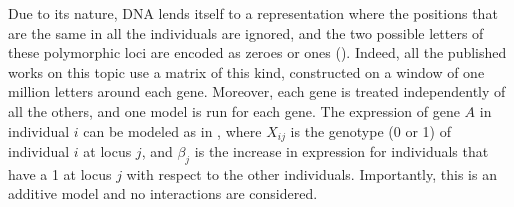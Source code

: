 Due to its nature, DNA lends itself to a representation where the 
positions that are the same in all the individuals are ignored, and the 
two possible letters of these polymorphic loci are encoded as zeroes or 
ones (). Indeed, all the published works on this 
topic use a matrix of this kind, constructed on a window of one million 
letters around each gene. Moreover, each gene is treated independently 
of all the others, and one model is run for each gene. The expression of 
gene $A$ in individual $i$ can be modeled as in , 
where $X_{ij}$ is the genotype (0 or 1) of individual $i$ at locus $j$, 
and $\beta_j$ is the increase in expression for individuals that have a 
1 at locus $j$ with respect to the other individuals. Importantly, this 
is an additive model and no interactions are considered.

